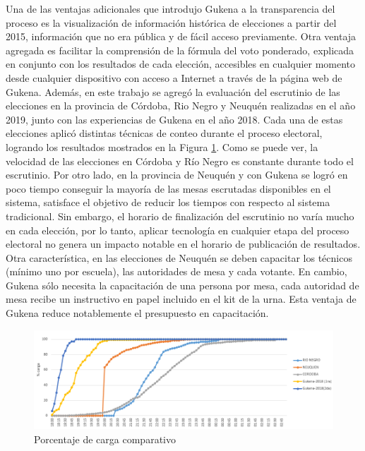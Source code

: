 Una de las ventajas adicionales que introdujo Gukena a la transparencia del proceso es la visualización de información histórica de elecciones a partir del 2015, información que no era pública y de fácil acceso previamente. Otra ventaja agregada es facilitar la comprensión de la fórmula del voto ponderado, explicada en conjunto con los resultados de cada elección, accesibles en cualquier momento desde cualquier dispositivo con acceso a Internet a través de la página web de Gukena.\newline
Además, en este trabajo se agregó la evaluación del escrutinio de las elecciones en la provincia de Córdoba, Rio Negro y Neuquén realizadas en el año 2019, junto con las experiencias de Gukena en el año 2018. Cada una de estas elecciones aplicó distintas técnicas de conteo durante el proceso electoral, logrando los resultados mostrados en la Figura \ref{graf:provincialConGukenaComparativo}. Como se puede ver, la velocidad de las elecciones en Córdoba y Río Negro es constante durante todo el escrutinio. Por otro lado, en la provincia de Neuquén y con Gukena se logró en poco tiempo conseguir la mayoría de las mesas escrutadas disponibles en el sistema, satisface el objetivo de reducir los tiempos con respecto al sistema tradicional. Sin embargo, el horario de finalización del escrutinio no varía mucho en cada elección, por lo tanto, aplicar tecnología en cualquier etapa del proceso electoral no genera un impacto notable en el horario de publicación de resultados.\newline
Otra característica, en las elecciones de Neuquén se deben capacitar los técnicos (mínimo uno por escuela), las autoridades de mesa y cada votante. En cambio, Gukena sólo necesita la capacitación de una persona por mesa, cada autoridad de mesa recibe un instructivo en papel incluido en el kit de la urna. Esta ventaja de Gukena reduce notablemente el presupuesto en capacitación.

\begin{figure}[h!]
    \begin{center}
        \includegraphics[width=\textwidth]{img/provincialGukena.png}
    \end{center}
  \caption{Porcentaje de carga comparativo}
  \label{graf:provincialConGukenaComparativo}
\end{figure}

